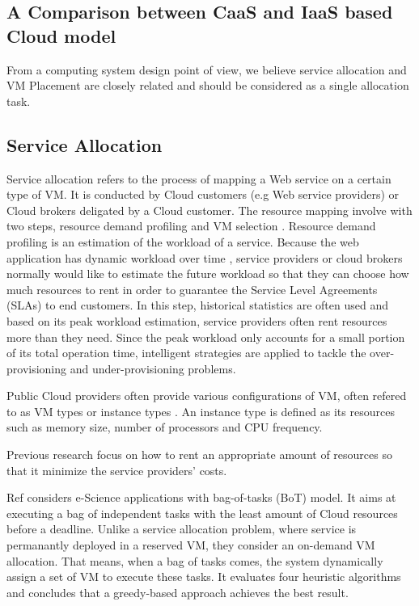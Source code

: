 \subsection*{A Comparison between CaaS and IaaS based Cloud model}
From a computing system design point of view, we believe service allocation and VM Placement
are closely related and should be considered as a single allocation task.
\subsection*{Service Allocation}
Service allocation refers to the process of mapping a Web service on a certain type of VM.
It is conducted by Cloud customers (e.g Web service providers) or Cloud brokers deligated by a 
Cloud customer.
The resource mapping involve with two steps, 
resource demand profiling \cite{} and VM selection \cite{}. 
Resource demand profiling is an estimation of the workload of a service. 
Because the web application has dynamic workload over time \cite{}, 
service providers or cloud brokers normally would like to estimate the future workload so that they 
can choose how much resources to rent in order to guarantee the 
Service Level Agreements (SLAs)  \cite{} to end customers. In this step, historical statistics
are often used and based on its peak workload estimation, service providers often
rent resources more than they need. Since the peak workload only accounts for a small portion
of its total operation time, intelligent strategies are applied to tackle the over-provisioning and 
under-provisioning problems.

Public Cloud providers often provide various configurations of VM, 
often refered to as VM types or instance types \cite{Li:2011ti}. 
An instance type is defined as its resources such as memory size, number of processors and 
CPU frequency. 

Previous research focus on how to rent an appropriate amount of resources so that it minimize the 
service providers' costs.

Ref \cite{Candeia:2010wt} considers e-Science applications with bag-of-tasks (BoT) model. It
aims at executing a bag of independent tasks with the least amount of Cloud resources before
a deadline.
Unlike a service allocation problem, where service is permanantly deployed in a reserved VM, 
they consider an on-demand VM allocation. 
That means, when a bag of tasks comes, the system
dynamically assign a set of VM to execute these tasks. 
It evaluates four heuristic algorithms and 
concludes that a greedy-based approach achieves the best result.

